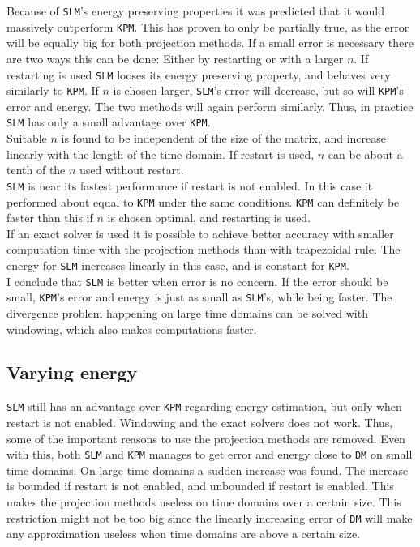 \noindent Because of \texttt{SLM}'s energy preserving properties it was predicted that it would massively outperform \texttt{KPM}. This has proven to only be partially true, as the error will be equally big for both projection methods. 
If a small error is necessary there are two ways this can be done: Either by restarting or with a larger $n$. If restarting is used \texttt{SLM} looses its energy preserving property, and behaves very similarly to \texttt{KPM}. If $n$ is chosen larger, \texttt{SLM}'s error will decrease, but so will \texttt{KPM}'s error and energy. The two methods will again perform similarly. Thus, in practice \texttt{SLM} has only a small advantage over \texttt{KPM}.\\

\noindent Suitable $n$ is found to be independent of the size of the matrix, and increase linearly with the length of the time domain. If restart is used, $n$ can be about a tenth of the $n$ used without restart.\\

\noindent \texttt{SLM} is near its fastest performance if restart is not enabled. In this case it performed about equal to \texttt{KPM} under the same conditions. \texttt{KPM} can definitely be faster than this if $n$ is chosen optimal, and restarting is used. \\

\noindent If an exact solver is used it is possible to achieve better accuracy with smaller computation time with the projection methods than with trapezoidal rule. The energy for \texttt{SLM} increases linearly in this case, and is constant for \texttt{KPM}.  \\

\noindent I conclude that \texttt{SLM} is better when error is no concern. If the error should be small, \texttt{KPM}'s error and energy is just as small as \texttt{SLM}'s, while being faster. The divergence problem happening on large time domains can be solved with windowing, which also makes computations faster. %
\subsection{Varying energy} %
\texttt{SLM} still has an advantage over \texttt{KPM} regarding energy estimation, but only when restart is not enabled. 
Windowing and the exact solvers does not work. Thus, some of the important reasons to use the projection methods are removed. Even with this, both \texttt{SLM} and \texttt{KPM} manages to get error and energy close to \texttt{DM} on small time domains. On large time domains a sudden increase was found. The increase is bounded if restart is not enabled, and unbounded if restart is enabled. This makes the projection methods useless on time domains over a certain size. This restriction might not be too big since the linearly increasing error of \texttt{DM} will make any approximation useless when time domains are above a certain size.\\

